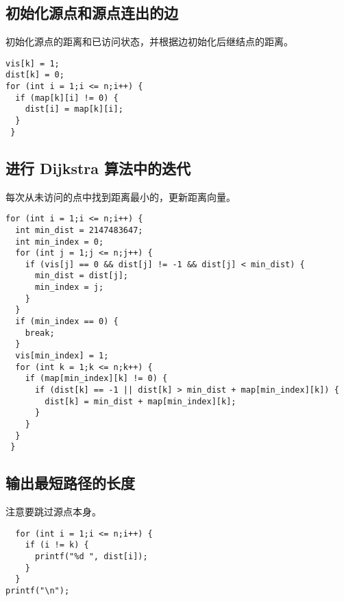 \documentclass[11pt]{article}
\begin{document}
\subsection{初始化源点和源点连出的边}
\label{sec:org3d4ec08}
初始化源点的距离和已访问状态，并根据边初始化后继结点的距离。

\begin{verbatim}
vis[k] = 1;
dist[k] = 0;
for (int i = 1;i <= n;i++) {
  if (map[k][i] != 0) {
    dist[i] = map[k][i];
  }
 }
\end{verbatim}

\subsection{进行 Dijkstra 算法中的迭代}
\label{sec:org694c152}
每次从未访问的点中找到距离最小的，更新距离向量。

\begin{verbatim}
for (int i = 1;i <= n;i++) {
  int min_dist = 2147483647;
  int min_index = 0;
  for (int j = 1;j <= n;j++) {
    if (vis[j] == 0 && dist[j] != -1 && dist[j] < min_dist) {
      min_dist = dist[j];
      min_index = j;
    }
  }
  if (min_index == 0) {
    break;
  }
  vis[min_index] = 1;
  for (int k = 1;k <= n;k++) {
    if (map[min_index][k] != 0) {
      if (dist[k] == -1 || dist[k] > min_dist + map[min_index][k]) {
        dist[k] = min_dist + map[min_index][k];
      }
    }
  }
 }
\end{verbatim}

\subsection{输出最短路径的长度}
\label{sec:org80e8b5f}
注意要跳过源点本身。

\begin{verbatim}
  for (int i = 1;i <= n;i++) {
    if (i != k) {
      printf("%d ", dist[i]);
    }
  }
printf("\n");
\end{verbatim}
\end{document}

